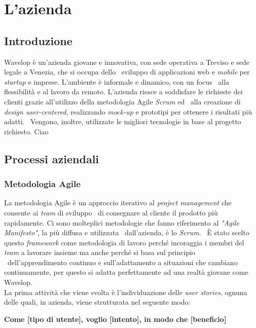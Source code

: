 
\chapter{L'azienda}
\label{cap:azienda}
\section{Introduzione}
Wavelop è un'azienda giovane e innovativa, con sede operativa a Treviso e sede legale a Venezia, che si occupa dello \
sviluppo di applicazioni web e \emph{mobile} per \emph{startup} e imprese. L'ambiente è informale e dinamico, con un focus \
alla flessibilità e al lavoro da remoto. L'azienda riesce a soddisfare le richieste dei clienti grazie all'utilizzo della metodologia Agile \emph{Scrum} ed \
alla creazione di \emph{design user-centered}, realizzando \emph{\gls{mock-up}} e prototipi per ottenere i risultati più adatti. \
Vengono, inoltre, utilizzate le migliori tecnologie in base al progetto richiesto. Ciao

\section{Processi aziendali}

\subsection{Metodologia Agile}
La metodologia Agile è un approccio iterativo al \emph{project management} che consente ai \emph{team} di sviluppo \
di consegnare al cliente il prodotto più rapidamente. Ci sono molteplici metodologie che fanno riferimento al \emph{"Agile Manifesto"}, la più diffusa e utilizzata \
dall'azienda, è lo \emph{Scrum}. \
È stato scelto questo \emph{framework} come metodologia di lavoro perché incoraggia i membri del \emph{team} a lavorare insieme ma anche perché si basa sul principio \
dell'apprendimento continuo e sull'adattamento a situazioni che cambiano continuamente, per questo si adatta perfettamente ad una realtà giovane come Wavelop. \\

La prima attività che viene svolta è l'individuazione delle \emph{user stories}, ognuna delle quali, in azienda, viene strutturata nel seguente modo:
\begin{center}
  \textbf{Come [tipo di utente], voglio [intento], in modo che [beneficio]}
\end{center}

